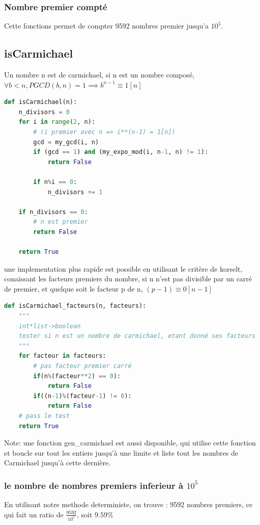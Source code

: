\documentclass{article}
\begin{document}
\subsubsection{Nombre premier compté}
Cette fonctions permet de compter 9592 nombres premier jusqu'a $10^5$.

\subsection{isCarmichael}
Un nombre n est de carmichael, si n est un nombre composé, $\forall b<n, \mathit{PGCD}(b, n)=1 \implies b^{n-1} \equiv 1 [n]$
\begin{lstlisting}[language=Python, caption=Implementation test Carmichael]
def isCarmichael(n):
    n_divisors = 0
    for i in range(2, n):
        # (i premier avec n => i**(n-1) = 1[n])
        gcd = my_gcd(i, n)
        if (gcd == 1) and (my_expo_mod(i, n-1, n) != 1):
            return False

        if n%i == 0:
            n_divisors += 1

    if n_divisors == 0:
        # n est premier 
        return False
    
    return True
\end{lstlisting}

une implementation plus rapide est possible en utilisant le critère de korselt, conaissant les facteurs premiers du nombre, si n n'est pas divisible par un carré de premier, et quelque soit le facteur p de n, $(p-1) \equiv 0[n-1]$

\begin{lstlisting}[language=Python, caption=Implementation test Carmichael_korselt]
def isCarmichael_facteurs(n, facteurs):
    """
    int*list->boolean
    tester si n est un nombre de carmichael, etant donné ses facteurs
    """
    for facteur in facteurs:
        # pas facteur premier carré
        if(n%(facteur**2) == 0):
            return False
        if((n-1)%(facteur-1) != 0):
            return False
    # pass le test
    return True
\end{lstlisting}

Note: une fonction gen\_carmichael est aussi disponible, qui utilise cette fonction et boucle sur tout les entiers jusqu'à une limite et liste tout les nombres de Carmichael jusqu'à cette dernière.

\subsubsection{le nombre de nombres premiers inferieur à $10^5$}
En utilisant notre methode deterministe, on trouve : 9592 nombres premiers, ce qui fait un ratio de $\frac{9592}{10^{5}}$, soit $9.59\% $
\end{document}
